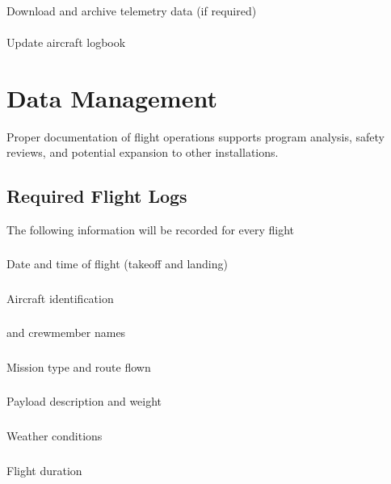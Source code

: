             \paragraph{} Download and archive telemetry data (if required)
            \paragraph{} Update aircraft logbook

\section{Data Management}\label{sec:datamgmt}

Proper documentation of flight operations supports program analysis, safety reviews, and potential expansion to other installations.

    \subsection{Required Flight Logs}\label{ssec:flightlogs}
    The following information will be recorded for every flight
        \subsubsection{} Date and time of flight (takeoff and landing)
        \subsubsection{} Aircraft identification
        \subsubsection{}  and crewmember names
        \subsubsection{} Mission type and route flown
        \subsubsection{} Payload description and weight
        \subsubsection{} Weather conditions
        \subsubsection{} Flight duration
